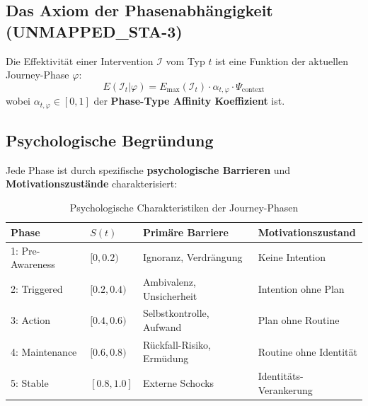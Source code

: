 \subsection{Das Axiom der Phasenabhängigkeit (UNMAPPED_STA-3)}

\begin{tcolorbox}[colback=blue!5!white, colframe=blue!75!black,
    title=Axiom UNMAPPED_STA-3: Phase-Dependent Intervention Efficacy]
Die Effektivität einer Intervention $\mathcal{I}$ vom Typ $t$ ist eine Funktion der aktuellen Journey-Phase $\varphi$:
\begin{equation}
E(\mathcal{I}_t | \varphi) = E_{\max}(\mathcal{I}_t) \cdot \alpha_{t,\varphi} \cdot \Psi_{\text{context}}
\label{eq:18-axiom-aw3}
\end{equation}
wobei $\alpha_{t,\varphi} \in [0, 1]$ der \textbf{Phase-Type Affinity Koeffizient} ist.
\end{tcolorbox}

\subsection{Psychologische Begründung}

Jede Phase ist durch spezifische \textbf{psychologische Barrieren} und \textbf{Motivationszustände} charakterisiert:

\begin{table}[htbp]
\centering
\caption{Psychologische Charakteristiken der Journey-Phasen}
\label{tab:18-phase-psychology}
\renewcommand{\arraystretch}{1.4}
\small
\begin{tabular}{@{}llll@{}}
\toprule
\textbf{Phase} & \textbf{$S(t)$} & \textbf{Primäre Barriere} & \textbf{Motivationszustand} \\
\midrule
1: Pre-Awareness & $[0, 0.2)$ & Ignoranz, Verdrängung & Keine Intention \\
2: Triggered & $[0.2, 0.4)$ & Ambivalenz, Unsicherheit & Intention ohne Plan \\
3: Action & $[0.4, 0.6)$ & Selbstkontrolle, Aufwand & Plan ohne Routine \\
4: Maintenance & $[0.6, 0.8)$ & Rückfall-Risiko, Ermüdung & Routine ohne Identität \\
5: Stable & $[0.8, 1.0]$ & Externe Schocks & Identitäts-Verankerung \\
\bottomrule
\end{tabular}
\end{table}

